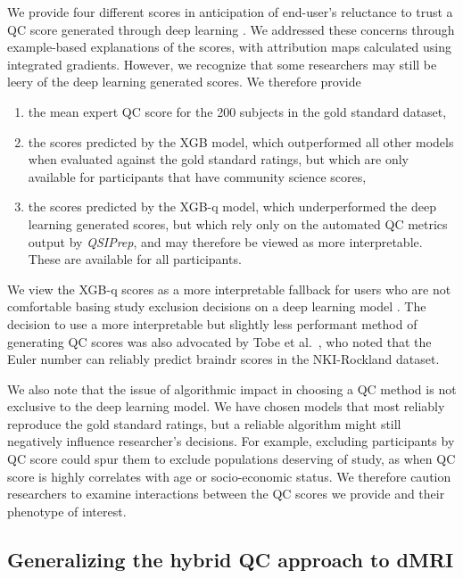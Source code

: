 \documentclass[fleqn,10pt]{wlscirep}
\begin{document}

We provide four different scores in anticipation of end-user's reluctance to
trust a QC score generated through deep learning \cite{lipton2017doctor,
salahuddin2022transparency, Zech2018-ki}. We addressed these concerns through
example-based explanations of the scores, with attribution maps calculated using
integrated gradients. However, we recognize that some researchers may still be
leery of the deep learning generated scores. We therefore provide
\begin{enumerate}
    \item the mean expert QC score for the 200 subjects in the gold standard
    dataset,
    \item the scores predicted by the XGB model, which outperformed all other models
    when evaluated against the gold standard ratings, but which are only available
    for participants that have community science scores,
    \item the scores predicted by the XGB-q model, which underperformed the deep
    learning generated scores, but which rely only on the automated QC metrics
    output by \emph{QSIPrep}, and may therefore be viewed as more interpretable.
    These are available for all participants.
\end{enumerate}
We view the XGB-q scores as a more interpretable fallback for users who are not
comfortable basing study exclusion decisions on a deep learning model
\cite{rudin2019stop}. The decision to use a more interpretable but slightly less
performant method of generating QC scores was also advocated by Tobe et
al.~\cite{tobe2021longitudinal}, who noted that the Euler number can reliably
predict braindr scores in the NKI-Rockland dataset.

We also note that the issue of algorithmic impact in choosing a QC method is not
exclusive to the deep learning model. We have chosen models that most reliably
reproduce the gold standard ratings, but a reliable algorithm might still
negatively influence researcher's decisions. For example, excluding participants
by QC score could spur them to exclude populations deserving of study, as when
QC score is highly correlates with age or socio-economic status. We therefore
caution researchers to examine interactions between the QC scores we provide and
their phenotype of interest.

\subsection*{Generalizing the hybrid QC approach to dMRI}
\end{document}
